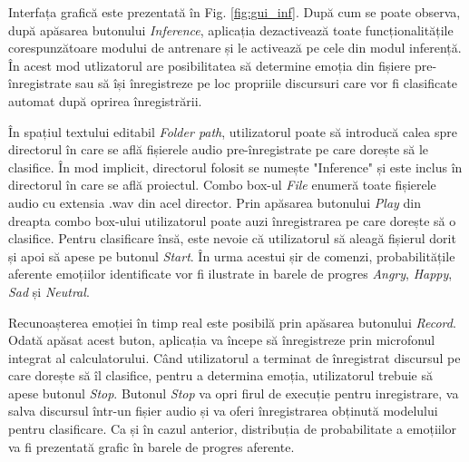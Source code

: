 \documentclass[a4paper,12pt]{book}
\begin{document}
		Interfața grafică este prezentată în Fig. \ref{fig:gui_inf}. După cum se poate observa, după apăsarea butonului \textit{Inference},
		aplicația dezactivează toate funcționalitățile corespunzătoare modului de antrenare și le activează pe cele din modul inferență. În acest mod utlizatorul are posibilitatea să determine emoția din fișiere pre-înregistrate sau să își înregistreze pe loc propriile discursuri care vor fi clasificate automat după oprirea înregistrării. \par
		
		În spațiul textului editabil \textit{Folder path}, utilizatorul poate să introducă calea spre directorul în care se află fișierele audio pre-înregistrate pe care dorește să le clasifice. În mod implicit, directorul folosit se numește "Inference" și este inclus în directorul în care se află proiectul. Combo box-ul \textit{File} enumeră toate fișierele audio cu extensia .wav din acel director. Prin apăsarea butonului \textit{Play} din dreapta combo box-ului utilizatorul poate auzi înregistrarea pe care dorește să o clasifice. Pentru clasificare însă, este nevoie că utilizatorul să aleagă fișierul dorit și apoi să apese pe butonul \textit{Start}. În urma acestui șir de comenzi, probabilitățile aferente emoțiilor identificate vor fi ilustrate in barele de progres \textit{Angry},  \textit{Happy}, \textit{Sad} și \textit{Neutral}. \par
		Recunoașterea emoției în timp real este posibilă prin apăsarea butonului \textit{Record}. Odată apăsat acest buton, aplicația va începe să înregistreze prin microfonul integrat al calculatorului. Când utilizatorul a terminat de înregistrat discursul pe care dorește să îl clasifice, pentru a determina emoția, utilizatorul trebuie să apese butonul \textit{Stop}. Butonul \textit{Stop} va opri firul de execuție pentru inregistrare, va salva discursul într-un fișier audio și va oferi înregistrarea obținută modelului pentru clasificare. Ca și în cazul anterior, distribuția de probabilitate a emoțiilor va fi prezentată grafic în barele de progres aferente. \par
\end{document}
